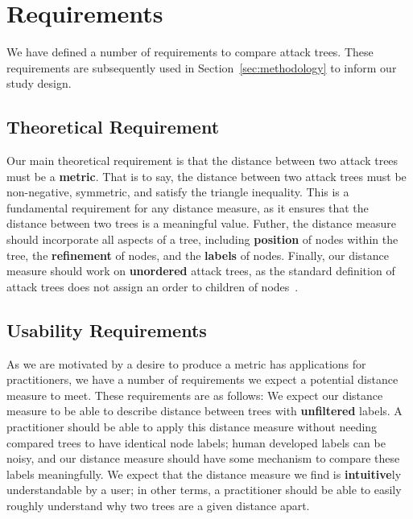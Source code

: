 



\section{Requirements}
\label{ssec:requirements}

We have defined a number of requirements to compare attack trees. These requirements are subsequently used in Section~\ref{sec:methodology} to inform our study design.

\subsection{Theoretical Requirement}

Our main theoretical requirement is that the distance between two attack trees must be a \textbf{metric}. That is to say, the distance between two attack trees must be non-negative, symmetric, and satisfy the triangle inequality. This is a fundamental requirement for any distance measure, as it ensures that the distance between two trees is a meaningful value. Futher, the distance measure should incorporate all aspects of a tree, including \textbf{position} of nodes within the tree, the \textbf{refinement} of nodes, and the \textbf{labels} of nodes. Finally, our distance measure should work on \textbf{unordered} attack trees, as the standard definition of attack trees does not assign an order to children of nodes~\cite{mauw_foundations_2006}.


\subsection{Usability Requirements}

As we are motivated by a desire to produce a metric has applications for practitioners, we have a number of requirements we expect a potential distance measure to meet. These requirements are as follows:
We expect our distance measure to be able to describe distance between trees with \textbf{unfiltered} labels. A practitioner should be able to apply this distance measure without needing compared trees to have identical node labels; human developed labels can be noisy, and our distance measure should have some mechanism to compare these labels meaningfully. We expect that the distance measure we find is \textbf{intuitive}ly understandable by a user; in other terms, a practitioner should be able to easily roughly understand why two trees are a given distance apart.





